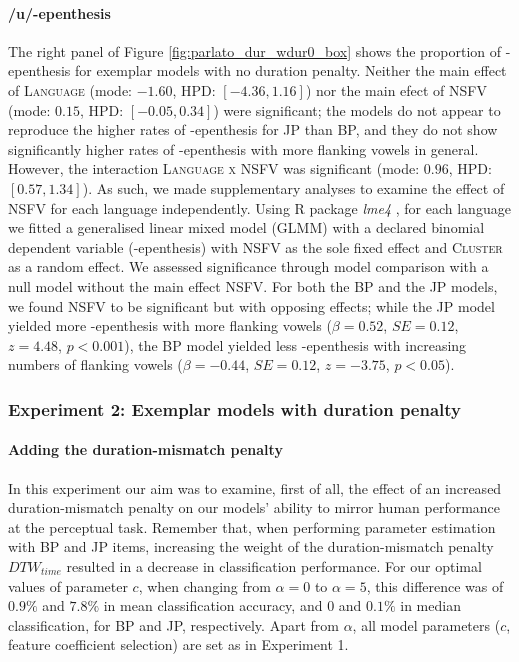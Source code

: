\paragraph{/u/-epenthesis}
The right panel of Figure \ref{fig:parlato_dur_wdur0_box} shows the proportion of -epenthesis for exemplar models with no duration penalty.
Neither the main effect of \textsc{Language} (mode: $-1.60$, HPD: $[-4.36, 1.16]$) nor the main efect of \textsc{NSFV} (mode: $0.15$, HPD: $[-0.05, 0.34]$) were significant; the models do not appear to reproduce the higher rates of -epenthesis for JP than BP, and they do not show significantly higher rates of -epenthesis with more  flanking vowels in general. 
However, the interaction \textsc{Language x NSFV} was significant (mode: $0.96$, HPD: $[0.57, 1.34]$). As such, we made supplementary analyses to examine the effect of NSFV for each language independently. Using R package \textit{lme4} \cite{R-lme4}, for each language we fitted a generalised linear mixed model (GLMM) with a declared binomial dependent variable (-epenthesis) with \textsc{NSFV} as the sole fixed effect and \textsc{Cluster} as a random effect. We assessed significance through model comparison with a null model without the main effect \textsc{NSFV}. For both the BP and the JP models, we found \textsc{NSFV} to be significant but with opposing effects; while the JP model yielded more -epenthesis with more  flanking vowels ($\beta = 0.52$, $SE = 0.12$, $z = 4.48$, $p < 0.001$), the BP model yielded less -epenthesis with increasing numbers of  flanking vowels ($\beta = -0.44$, $SE = 0.12$, $z = -3.75$, $p < 0.05$).     

\subsubsection{Experiment 2: Exemplar models with duration penalty}

\paragraph{Adding the duration-mismatch penalty}
In this experiment our aim was to examine, first of all, the effect of an increased duration-mismatch penalty on our models' ability to mirror human performance at the perceptual task. Remember that, when performing parameter estimation with BP and JP items, increasing the weight of the duration-mismatch penalty $DTW_{time}$ resulted in a decrease in classification performance. For our optimal values of parameter $c$, when changing from $\alpha = 0$ to $\alpha = 5$, this difference was of $0.9\%$ and $7.8\%$ in mean classification accuracy, and $0$ and $0.1\%$ in median classification, for BP and JP, respectively. Apart from $\alpha$, all model parameters ($c$, feature coefficient selection) are set as in Experiment 1.    

